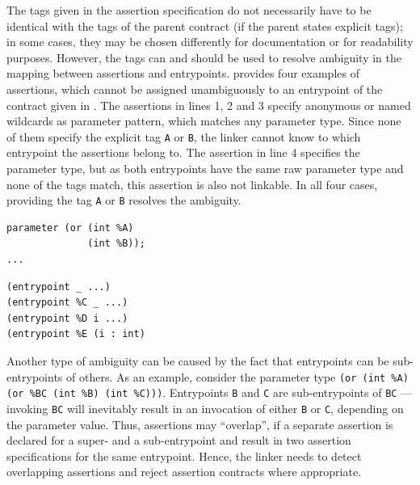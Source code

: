 The tags given in the assertion specification do not necessarily have to be identical with the tags of the parent contract (if the parent states explicit tags); in some cases, they may be chosen differently for documentation or for readability purposes. However, the tags can and should be used to resolve ambiguity in the mapping between assertions and entrypoints.  provides four examples of assertions, which cannot be assigned unambiguously to an entrypoint of the contract given in . The assertions in lines 1, 2 and 3 specify anonymous or named wildcards as parameter pattern, which matches any parameter type. Since none of them specify the explicit tag \texttt{A} or \texttt{B}, the linker cannot know to which entrypoint the assertions belong to. The assertion in line 4 specifies the parameter type, but as both entrypoints have the same raw parameter type and none of the tags match, this assertion is also not linkable. In all four cases, providing the tag \texttt{A} or \texttt{B} resolves the ambiguity.

\vspace{\baselineskip}
\noindent
\begin{minipage}{.4\textwidth}
\begin{lstlisting}[label=lst:ambiguity_parent, numbers=none, language=Michelson, caption=Example2.tz]
parameter (or (int %A)
              (int %B));
...
\end{lstlisting}
\end{minipage}\hfill
\begin{minipage}{.5\textwidth}
\begin{lstlisting}[label=lst:ambiguity_assertion, language=Assertion, caption=Ambiguous assertions for Example2.tz]
(entrypoint _ ...)
(entrypoint %C _ ...)
(entrypoint %D i ...)
(entrypoint %E (i : int)
\end{lstlisting}
\end{minipage}
\vspace{\baselineskip}

Another type of ambiguity can be caused by the fact that entrypoints can be sub-entrypoints of others. As an example, consider the parameter type \texttt{(or (int \%A) (or \%BC (int \%B) (int \%C)))}. Entrypoints \texttt{B} and \texttt{C} are sub-entrypoints of \texttt{BC} --- invoking \texttt{BC} will inevitably result in an invocation of either \texttt{B} or \texttt{C}, depending on the parameter value. Thus, assertions may ``overlap'', if a separate assertion is declared for a super- and a sub-entrypoint and result in two assertion specifications for the same entrypoint. Hence, the linker needs to detect overlapping assertions and reject assertion contracts where appropriate.

